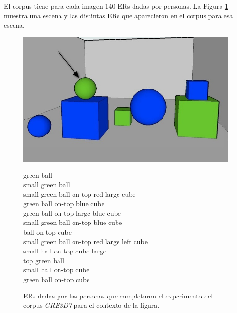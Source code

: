 El corpus tiene para cada imagen 140 ERs dadas por personas. La Figura \ref{fig4-4} muestra una escena y las distintas ERs que aparecieron en el corpus para esa escena.
\begin{figure}[H]
\begin{minipage}[b]{0.5\linewidth}
\centering
\includegraphics[width=\textwidth]{images/3.jpg}
\end{minipage}
\hspace*{1cm}
\begin{minipage}[b]{0.5\linewidth}
\footnotesize{

green ball \\
small green ball  \\
small green ball on-top red large cube \\
green ball on-top blue cube\\
green ball on-top large blue cube \\
small green ball on-top blue cube  \\
ball on-top cube \\
small green ball on-top red large left cube  \\
small ball on-top cube large  \\
top green ball   \\
small ball on-top cube  \\
green ball on-top cube  \\
}
\end{minipage}
\caption{ERs dadas por las personas que completaron el experimento del corpus \textit{GRE3D7} para el contexto de la figura.}\label{fig4-4}
\end{figure}
